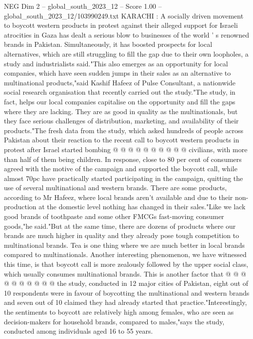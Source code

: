 \begin{textsample}{NEG Dim 2 – global\_south\_2023\_12 – Score 1.00 – global\_south\_2023\_12/103990249.txt}  \label{ex:f2_neg_289}
KARACHI : A socially driven movement to boycott western products in protest against their alleged support for Israeli atrocities in Gaza has dealt a serious blow to businesses of the world ' s renowned brands in Pakistan.
Simultaneously, it has boosted prospects for local alternatives, which are still struggling to fill the gap due to their own loopholes, a study and industrialists said."This also emerges as an opportunity for local companies, which have seen sudden jumps in their sales as an alternative to multinational products,"said Kashif Hafeez of Pulse Consultant, a nationwide social research organisation that recently carried out the study."The study, in fact, helps our local companies capitalise on the opportunity and fill the gaps where they are lacking.
They are as good in quality as the multinationals, but they face serious challenges of distribution, marketing, and availability of their products."The fresh data from the study, which asked hundreds of people across Pakistan about their reaction to the recent call to boycott western products in protest after Israel started bombing @ @ @ @ @ @ @ @ @ @ civilians, with more than half of them being children.
In response, close to 80 per cent of consumers agreed with the motive of the campaign and supported the boycott call, while almost 70pc have practically started participating in the campaign, quitting the use of several multinational and western brands.
There are some products, according to Mr Hafeez, where local brands aren't available and due to their non-production at the domestic level nothing has changed in their sales."Like we lack good brands of toothpaste and some other FMCGs fast-moving consumer goods,"he said."But at the same time, there are dozens of products where our brands are much higher in quality and they already pose tough competition to multinational brands.
Tea is one thing where we are much better in local brands compared to multinationals.
Another interesting phenomenon, we have witnessed this time, is that boycott call is more zealously followed by the upper social class, which usually consumes multinational brands.
This is another factor that @ @ @ @ @ @ @ @ @ @ the study, conducted in 12 major cities of Pakistan, eight out of 10 respondents were in favour of boycotting the multinational and western brands and seven out of 10 claimed they had already started that practice."Interestingly, the sentiments to boycott are relatively high among females, who are seen as decision-makers for household brands, compared to males,"says the study, conducted among individuals aged 16 to 55 years.

\end{textsample}

